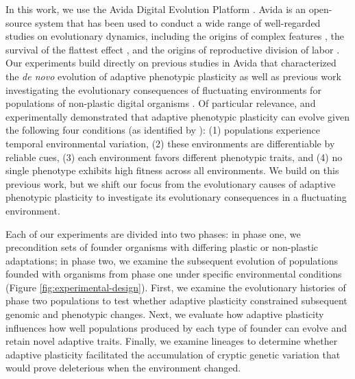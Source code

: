 In this work, we use the Avida Digital Evolution Platform \citep{ofria_avida:_2009}.
Avida is an open-source system that has been used to conduct a wide range of well-regarded studies on evolutionary dynamics, including 
the origins of complex features \citep{lenski_evolutionary_2003},
the survival of the flattest effect \citep{wilke_evolution_2001},
and the origins of reproductive division of labor \citep{goldsby_evolutionary_2014}.
Our experiments build directly on previous studies in Avida that characterized the \textit{de novo} evolution of adaptive phenotypic plasticity \citep{clune_investigating_2007,lalejini_evolutionary_2016} as well as previous work investigating the evolutionary consequences of fluctuating environments for populations of non-plastic digital organisms \citep{li_digital_2004,canino-koning_fluctuating_2019}.
Of particular relevance, \cite{clune_investigating_2007} and \cite{lalejini_evolutionary_2016} experimentally demonstrated that adaptive phenotypic plasticity can evolve given the following four conditions (as identified by \citealt{ghalambor_behavior_2010}):
(1) populations experience temporal environmental variation,
(2) these environments are differentiable by reliable cues,
(3) each environment favors different phenotypic traits,
and (4) no single phenotype exhibits high fitness across all environments.
We build on this previous work, but we shift our focus from the evolutionary causes of adaptive phenotypic plasticity to investigate its evolutionary consequences in a fluctuating environment.


Each of our experiments are divided into two phases: in phase one, we precondition sets of founder organisms with differing plastic or non-plastic adaptations;
in phase two, we examine the subsequent evolution of populations founded with organisms from phase one under specific environmental conditions (Figure \ref{fig:experimental-design}).
First, we examine the evolutionary histories of phase two populations to test whether adaptive plasticity constrained subsequent genomic and phenotypic changes. 
Next, we evaluate how adaptive plasticity influences how well populations produced by each type of founder can evolve and retain novel adaptive traits.
Finally, we examine lineages to determine whether adaptive plasticity facilitated the accumulation of cryptic genetic variation that would prove deleterious when the environment changed. 

